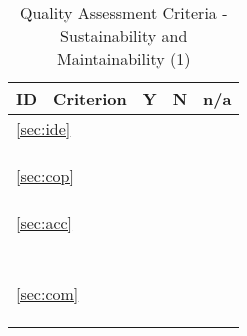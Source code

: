 \documentclass[a4paper,11pt]{article}
\begin{document}
\begin{table}[hbt]
	\begin{tabular}
		{ p{} | 
		  p{} |
		  p{} |
		  p{} |
		  p{} }
		\hline
		\textbf{ID} & \textbf{Criterion} & \textbf{Y} & \textbf{N} & \textbf{n/a} \\
		\hline
		\multicolumn{5}{l}{\ref{sec:ide}{ }\nameref{sec:ide}} \\
		\hline
		\hyperref[id:id1]{\idOneID} & \idOneText & & & \\
		\hyperref[id:id2]{\idTwoID} & \idTwoText & & & \\
		\hyperref[id:id3]{\idThreeID} & \idThreeText & & & \\
		\hline
		\multicolumn{5}{l}{\ref{sec:cop}{ }\nameref{sec:cop}} \\
		\hline
		\hyperref[id:cp1]{\cpOneID} & \cpOneText & & & \\
		\hyperref[id:cp2]{\cpTwoID} & \cpTwoText & & & \\
		\hyperref[id:cp3]{\cpThreeID} & \cpThreeText & & & \\
		\hline
		\multicolumn{5}{l}{\ref{sec:acc}{ }\nameref{sec:acc}} \\
		\hline
		\hyperref[id:ac1]{\acOneID} & \acOneText & & & \\
		\hyperref[id:ac2]{\acTwoID} & \acTwoText & & & \\
		\hyperref[id:ac3]{\acThreeID} & \acThreeText & & & \\
		\hyperref[id:ac4]{\acFourID} & \acFourText & & & \\
		\hyperref[id:ac5]{\acFiveID} & \acFiveText & & & \\
		\hyperref[id:ac6]{\acSixID} & \acSixText & & & \\
		\hyperref[id:ac7]{\acSevenID} & \acSevenText & & & \\
		\hline
		\multicolumn{5}{l}{\ref{sec:com}{ }\nameref{sec:com}} \\
		\hline
		\hyperref[id:cm1]{\cmOneID} & \cmOneText & & & \\
		\hyperref[id:cm2]{\cmTwoID} & \cmTwoText & & & \\
		\hyperref[id:cm3]{\cmThreeID} & \cmThreeText & & & \\
		\hline
	\end{tabular}
	\caption{Quality Assessment Criteria - Sustainability and Maintainability (1)}
	\label{tab:criteriaSustMaint1}
\end{table}
\end{document}
